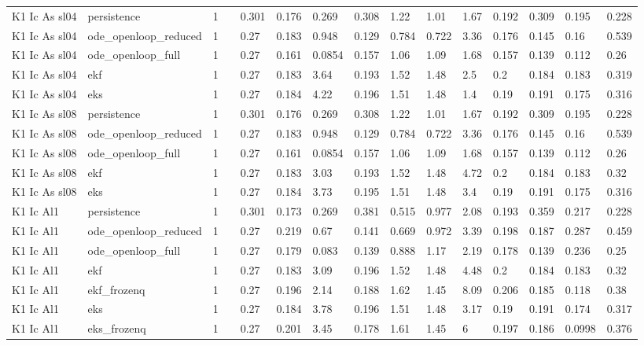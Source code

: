 \begin{table}[t]
\begin{tabular}{lllllllllllllll}
K1 Ic As sl04 & persistence & 1 &  & 0.301 & 0.176 & 0.269 & 0.308 & 1.22 & 1.01 & 1.67 & 0.192 & 0.309 & 0.195 & 0.228 \\
K1 Ic As sl04 & ode\_openloop\_reduced & 1 &  & 0.27 & 0.183 & 0.948 & 0.129 & 0.784 & 0.722 & 3.36 & 0.176 & 0.145 & 0.16 & 0.539 \\
K1 Ic As sl04 & ode\_openloop\_full & 1 &  & 0.27 & 0.161 & 0.0854 & 0.157 & 1.06 & 1.09 & 1.68 & 0.157 & 0.139 & 0.112 & 0.26 \\
K1 Ic As sl04 & ekf & 1 &  & 0.27 & 0.183 & 3.64 & 0.193 & 1.52 & 1.48 & 2.5 & 0.2 & 0.184 & 0.183 & 0.319 \\
K1 Ic As sl04 & eks & 1 &  & 0.27 & 0.184 & 4.22 & 0.196 & 1.51 & 1.48 & 1.4 & 0.19 & 0.191 & 0.175 & 0.316 \\
K1 Ic As sl08 & persistence & 1 &  & 0.301 & 0.176 & 0.269 & 0.308 & 1.22 & 1.01 & 1.67 & 0.192 & 0.309 & 0.195 & 0.228 \\
K1 Ic As sl08 & ode\_openloop\_reduced & 1 &  & 0.27 & 0.183 & 0.948 & 0.129 & 0.784 & 0.722 & 3.36 & 0.176 & 0.145 & 0.16 & 0.539 \\
K1 Ic As sl08 & ode\_openloop\_full & 1 &  & 0.27 & 0.161 & 0.0854 & 0.157 & 1.06 & 1.09 & 1.68 & 0.157 & 0.139 & 0.112 & 0.26 \\
K1 Ic As sl08 & ekf & 1 &  & 0.27 & 0.183 & 3.03 & 0.193 & 1.52 & 1.48 & 4.72 & 0.2 & 0.184 & 0.183 & 0.32 \\
K1 Ic As sl08 & eks & 1 &  & 0.27 & 0.184 & 3.73 & 0.195 & 1.51 & 1.48 & 3.4 & 0.19 & 0.191 & 0.175 & 0.316 \\
K1 Ic Al1 & persistence & 1 &  & 0.301 & 0.173 & 0.269 & 0.381 & 0.515 & 0.977 & 2.08 & 0.193 & 0.359 & 0.217 & 0.228 \\
K1 Ic Al1 & ode\_openloop\_reduced & 1 &  & 0.27 & 0.219 & 0.67 & 0.141 & 0.669 & 0.972 & 3.39 & 0.198 & 0.187 & 0.287 & 0.459 \\
K1 Ic Al1 & ode\_openloop\_full & 1 &  & 0.27 & 0.179 & 0.083 & 0.139 & 0.888 & 1.17 & 2.19 & 0.178 & 0.139 & 0.236 & 0.25 \\
K1 Ic Al1 & ekf & 1 &  & 0.27 & 0.183 & 3.09 & 0.196 & 1.52 & 1.48 & 4.48 & 0.2 & 0.184 & 0.183 & 0.32 \\
K1 Ic Al1 & ekf\_frozenq & 1 &  & 0.27 & 0.196 & 2.14 & 0.188 & 1.62 & 1.45 & 8.09 & 0.206 & 0.185 & 0.118 & 0.38 \\
K1 Ic Al1 & eks & 1 &  & 0.27 & 0.184 & 3.78 & 0.196 & 1.51 & 1.48 & 3.17 & 0.19 & 0.191 & 0.174 & 0.317 \\
K1 Ic Al1 & eks\_frozenq & 1 &  & 0.27 & 0.201 & 3.45 & 0.178 & 1.61 & 1.45 & 6 & 0.197 & 0.186 & 0.0998 & 0.376 \\

\end{tabular}
\end{table}
